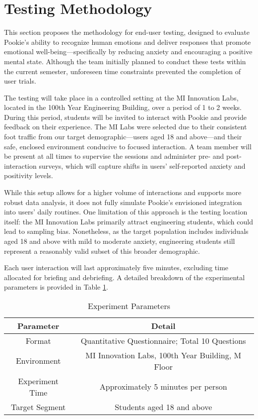 \section{Testing Methodology}
\label{sec:testing-methodology}
This section proposes the methodology for end-user testing, designed to evaluate Pookie’s ability to recognize human emotions and deliver responses that promote emotional well-being—specifically by reducing anxiety and encouraging a positive mental state. Although the team initially planned to conduct these tests within the current semester, unforeseen time constraints prevented the completion of user trials.

The testing will take place in a controlled setting at the MI Innovation Labs, located in the 100th Year Engineering Building, over a period of 1 to 2 weeks. During this period, students will be invited to interact with Pookie and provide feedback on their experience. The MI Labs were selected due to their consistent foot traffic from our target demographic—users aged 18 and above—and their safe, enclosed environment conducive to focused interaction. A team member will be present at all times to supervise the sessions and administer pre- and post-interaction surveys, which will capture shifts in users' self-reported anxiety and positivity levels.

While this setup allows for a higher volume of interactions and supports more robust data analysis, it does not fully simulate Pookie’s envisioned integration into users’ daily routines.  One limitation of this approach is the testing location itself: the MI Innovation Labs primarily attract engineering students, which could lead to sampling bias. Nonetheless, as the target population includes individuals aged 18 and above with mild to moderate anxiety, engineering students still represent a reasonably valid subset of this broader demographic.

Each user interaction will last approximately five minutes, excluding time allocated for briefing and debriefing. A detailed breakdown of the experimental parameters is provided in Table \ref{tab:19-experiment}.

\begin{table}[h]
    \centering
    \begin{tabular}{|c|c|}
        \hline
        \textbf{Parameter} & \textbf{Detail} \\
        \hline
        Format   & Quantitative Questionnaire; Total 10 Questions   \\
        \hline
        Environment     & MI Innovation Labs, 100th Year Building, M Floor     \\
        \hline
        Experiment Time & Approximately 5 minutes per person     \\
        \hline
        Target Segment & Students aged 18 and above     \\
        \hline
    \end{tabular}
    \caption{Experiment Parameters}
    \label{tab:19-experiment}
\end{table}

